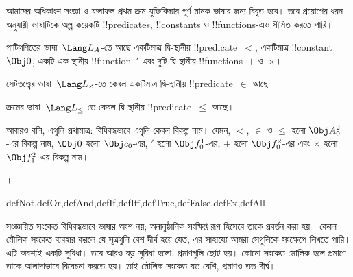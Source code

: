 \documentclass[../../../include/open-logic-section]{subfiles}
\begin{document}
আমাদের অধিকাংশ সংজ্ঞা ও ফলাফল প্রথম-ক্রম যুক্তিবিদ্যার পূর্ণ মানক ভাষার
জন্য বিবৃত হবে। তবে প্রয়োগের ধরন অনুযায়ী ভাষাটিকে অল্প কয়েকটি
!!{predicate}s, !!{constant}s ও !!{function}s-এও সীমিত করতে পারি।

\begin{ex}
পাটিগণিতের ভাষা~$\Lang L_A$-তে আছে একটিমাত্র দ্বি-স্থানীয়
!!{predicate}~$<$, একটিমাত্র !!{constant}~$\Obj 0$, একটি এক-স্থানীয়
!!{function}~$\prime$ এবং দুটি দ্বি-স্থানীয় !!{function}s~$+$ ও~$\times$।
\end{ex}

\begin{ex}
সেটতত্ত্বের ভাষা~$\Lang L_Z$-তে কেবল একটিমাত্র দ্বি-স্থানীয়
!!{predicate}~$\in$ আছে।
\end{ex}

\begin{ex}
ক্রমের ভাষা~$\Lang L_\le$-তে কেবল দ্বি-স্থানীয়
!!{predicate}~$\le$ আছে।
\end{ex}

আবারও বলি, এগুলি প্রথামাত্র: বিধিবদ্ধভাবে এগুলি কেবল বিকল্প নাম। যেমন,
$<$, $\in$ ও $\le$ হলো $\Obj A^2_0$-এর বিকল্প নাম, $\Obj 0$ হলো
$\Obj c_0$-এর, $\prime$ হলো $\Obj f^1_0$-এর, $+$ হলো $\Obj f^2_0$-এর
এবং $\times$ হলো $\Obj f^2_1$-এর বিকল্প নাম।

।

\begin{tagblock}{defNot,defOr,defAnd,defIf,defIff,defTrue,defFalse,defEx,defAll}
\begin{explain}
সংজ্ঞায়িত সংকেত বিধিবদ্ধভাবে ভাষার অংশ নয়; অনানুষ্ঠানিক সংক্ষিপ্ত রূপ
হিসেবে তাকে প্রবর্তন করা হয়। কেবল মৌলিক সংকেত ব্যবহার করলে যে সূত্রগুলি
বেশ দীর্ঘ হয়ে যেত, এর সাহায্যে আমরা সেগুলিকে সংক্ষেপে লিখতে পারি। এটি
অবশ্যই একটি সুবিধা। তবে আরও বড় সুবিধা হলো, প্রমাণগুলি ছোট হয়। কোনো
সংকেত মৌলিক হলে প্রমাণে তাকে আলাদাভাবে বিবেচনা করতে হয়। তাই মৌলিক
সংকেত যত বেশি, প্রমাণও তত দীর্ঘ।
\end{explain}
\end{tagblock}
\end{document}
